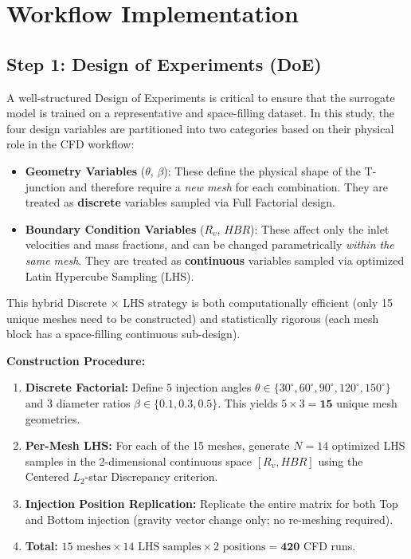 \documentclass[12pt, a4paper]{report}
\begin{document}
\section{Workflow Implementation}

\subsection{Step 1: Design of Experiments (DoE)}
A well-structured Design of Experiments is critical to ensure that the surrogate model is trained on a representative and space-filling dataset. In this study, the four design variables are partitioned into two categories based on their physical role in the CFD workflow:

\begin{itemize}
    \item \textbf{Geometry Variables} ($\theta$, $\beta$): These define the physical shape of the T-junction and therefore require a \textit{new mesh} for each combination. They are treated as \textbf{discrete} variables sampled via Full Factorial design.
    \item \textbf{Boundary Condition Variables} ($R_v$, $HBR$): These affect only the inlet velocities and mass fractions, and can be changed parametrically \textit{within the same mesh}. They are treated as \textbf{continuous} variables sampled via optimized Latin Hypercube Sampling (LHS).
\end{itemize}

\noindent This hybrid Discrete $\times$ LHS strategy is both computationally efficient (only 15 unique meshes need to be constructed) and statistically rigorous (each mesh block has a space-filling continuous sub-design).

\textbf{Construction Procedure:}
\begin{enumerate}
    \item \textbf{Discrete Factorial:} Define $5$ injection angles $\theta \in \{30^\circ, 60^\circ, 90^\circ, 120^\circ, 150^\circ\}$ and $3$ diameter ratios $\beta \in \{0.1, 0.3, 0.5\}$. This yields $5 \times 3 = \textbf{15}$ unique mesh geometries.
    \item \textbf{Per-Mesh LHS:} For each of the 15 meshes, generate $N = 14$ optimized LHS samples in the 2-dimensional continuous space $[R_v, HBR]$ using the Centered $L_2$-star Discrepancy criterion.
    \item \textbf{Injection Position Replication:} Replicate the entire matrix for both Top and Bottom injection (gravity vector change only; no re-meshing required).
    \item \textbf{Total:} $15 \text{ meshes} \times 14 \text{ LHS samples} \times 2 \text{ positions} = \textbf{420}$ CFD runs.
\end{enumerate}
\end{document}
